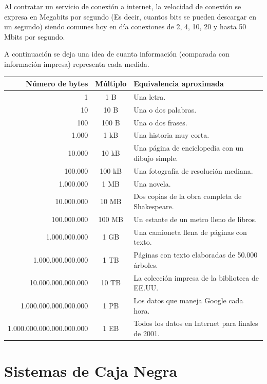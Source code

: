 Al contratar un servicio de conexión a internet, la velocidad de conexión se
expresa en Megabits por segundo (Es decir, cuantos bits se pueden descargar en
un segundo) siendo comunes hoy en día conexiones de 2, 4, 10, 20 y hasta 50
Mbits por segundo.

A continuación se deja una idea de cuanta información (comparada con información
impresa) representa cada medida.

\small
\begin{tabular}{r c l}
    Número de bytes	& Múltiplo & Equivalencia aproximada\\
    \hline
                        1 &	1 B	    & Una letra.\\
                       10 & 10 B	& Una o dos palabras.\\
                      100 & 100 B	& Una o dos frases.\\
                    1.000 &	1 kB	& Una historia muy corta.\\
                   10.000 &	10 kB	& Una página de enciclopedia con un dibujo
                   simple.\\
                  100.000 & 100 kB	& Una fotografía de resolución mediana.\\
                1.000.000 & 1 MB	& Una novela.\\
               10.000.000 & 10 MB	& Dos copias de la obra completa de
               Shakespeare.\\
              100.000.000 & 100 MB	& Un estante de un metro lleno de libros.\\
            1.000.000.000 & 1 GB	& Una camioneta llena de páginas con
            texto.\\
        1.000.000.000.000 & 1 TB	& Páginas con texto elaboradas de 50.000
        árboles.\\
       10.000.000.000.000 & 10 TB	& La colección impresa de la biblioteca de
       EE.UU.\\
    1.000.000.000.000.000 & 1 PB	& Los datos que maneja Google cada hora.\\
1.000.000.000.000.000.000 & 1 EB	& Todos los datos en Internet para finales
de 2001.\\
\end{tabular}
\normalsize

\section{Sistemas de Caja Negra}
\label{chap:bajo_nivel:sec:caja_negra}

